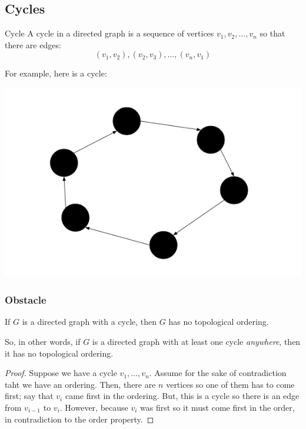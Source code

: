 \documentclass[letterpaper]{article}
\begin{document}
\subsection{Cycles}
\begin{definition}{Cycle}{}
    A cycle in a directed graph is a sequence of vertices $v_1, v_2, \dots, v_n$ so that there are edges: 
    \[(v_1, v_2), (v_2, v_3), \dots, (v_n, v_1)\]
\end{definition}
For example, here is a cycle:
\begin{center}
    \includegraphics[scale=0.7]{../assets/dir_graph_1.png}
\end{center}

\subsubsection{Obstacle}
\begin{proposition}
    If $G$ is a directed graph with a cycle, then $G$ has no topological ordering.
\end{proposition}
So, in other words, if $G$ is a directed graph with at least one cycle \emph{anywhere}, then it has no topological ordering.

\begin{mdframed}[]
    \begin{proof}
        Suppose we have a cycle $v_1, \dots, v_n$. Assume for the sake of contradiction taht we have an ordering. Then, there are $n$ vertices so one of them has to come first; say that $v_i$ came first in the ordering. But, this is a cycle so there is an edge from $v_{i - 1}$ to $v_i$. However, because $v_i$ was first so it must come first in the order, in contradiction to the order property. 
    \end{proof}
\end{mdframed}
\end{document}
